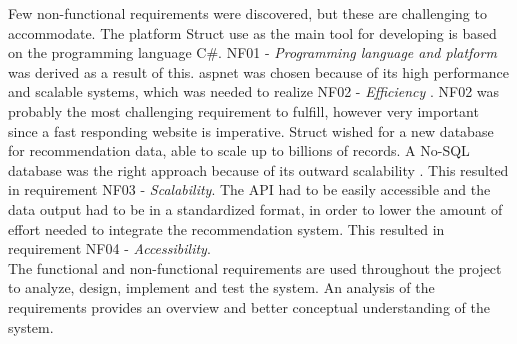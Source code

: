 Few non-functional requirements were discovered, but these are challenging to accommodate. The platform Struct use as the main tool for developing is based on the programming language C\#. NF01 - \textit{Programming language and platform} was derived as a result of this. \gls{aspnet} was chosen because of its high performance and scalable systems, which was needed to realize NF02 - \textit{Efficiency} \cite{NetCore}.
NF02 was probably the most challenging requirement to fulfill, however very important since a fast responding website is imperative. Struct wished for a new database for recommendation data, able to scale up to billions of records. A No-SQL database was the right approach because of its outward scalability \cite{NoSQLScalability}. This resulted in requirement NF03 - \textit{Scalability}. The \gls{API} had to be easily accessible and the data output had to be in a standardized format, in order to lower the amount of effort needed to integrate the recommendation system. This resulted in requirement NF04 - \textit{Accessibility}.\\
The functional and non-functional requirements are used throughout the project to analyze, design, implement and test the system. An analysis of the requirements provides an overview and better conceptual understanding of the system.
